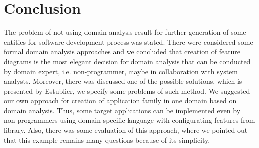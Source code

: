 \documentclass[conference]{IEEEtran}
\begin{document}
\section{Conclusion}
\label{chapter:conclusion}
The problem of not using domain analysis result for further generation of some entities for software development process was stated. There were considered some formal domain analysis approaches and we concluded that creation of feature diagrams is the most elegant decision for domain analysis that can be conducted by domain expert, i.e. non-programmer, maybe in collaboration with system analysts. Moreover, there was discussed one of the possible solutions, which is presented by Estublier, we specify some problems of such method. We suggested our own approach for creation of application family in one domain based on domain analysis. Thus, some target applications can be implemented even by non-programmers using domain-specific language with configurating features from library. Also, there was some evaluation of this approach, where we pointed out that this example remains many questions because of its simplicity.



\end{document}

